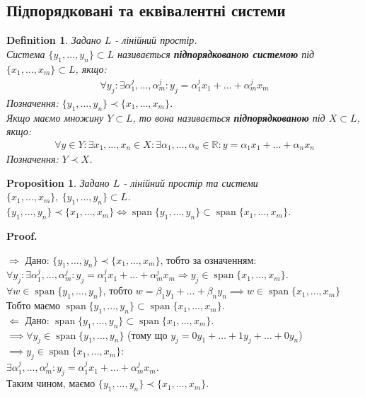 \documentclass[a4paper, 10pt]{article}
\makeatletter
\def\rightproof{$\boxed{\Rightarrow}$ }
\def\leftproof{$\boxed{\Leftarrow}$ }
\theoremstyle{theoremdd}
\newtheorem{definition}[theorem]{Definition}
\newtheorem{proposition}[theorem]{Proposition}
\DeclareMathOperator{\linspan}{span}
\renewenvironment{proof}[1][Proof.\\]{\par
\pushQED{\hfill \qed}%
\normalfont \topsep6\p@\@plus6\p@\relax
\trivlist
\item\relax
{\bfseries
#1\@addpunct{.}}\hspace\labelsep\ignorespaces
}{%
\popQED\endtrivlist\@endpefalse
}
\makeatother
\begin{document}
	\subsection{Підпорядковані та еквівалентні системи}
	\begin{definition}
	Задано $L$ - лінійний простір.\\
	Система $\{y_1, \dots, y_n \} \subset L$ називається \textbf{підпорядкованою системою} під $\{x_1, \dots, x_m\} \subset L$, якщо:
	\begin{align*}
	\forall y_j: \exists \alpha^j_1, \dots, \alpha^j_m: y_j = \alpha^j_1 x_1 + \dots + \alpha^j_m x_m
	\end{align*}
	Позначення: $\{y_1, \dots, y_n \} \prec \{x_1, \dots, x_m \}$.\\
	Якщо маємо множину $Y \subset L$, то вона називається \textbf{підпорядкованою} під $X \subset L$, якщо:
	\begin{align*}
	\forall y \in Y: \exists x_1,\dots,x_n \in X: \exists \alpha_1, \dots, \alpha_n \in \mathbb{R}: y = \alpha_1 x_1 + \dots + \alpha_n x_n
	\end{align*}
	Позначення: $Y \prec X$.
	\end{definition}
	
	\begin{proposition}
	\label{subordinate_prp1}
	Задано $L$ - лінійний простір та системи $\{x_1,\dots,x_m\},\ \{y_1,\dots,y_n\} \subset L$.\\
	$\{y_1, \dots, y_n \} \prec \{x_1, \dots, x_m \} \iff \linspan \{y_1, \dots, y_n\} \subset \linspan \{x_1, \dots, x_m \}$.
	\end{proposition}
	
	\begin{proof}
	\rightproof Дано: $\{y_1, \dots, y_n \} \prec \{x_1, \dots, x_m \}$, тобто за означенням:\\
	$\forall y_j: \exists \alpha^j_1, \dots, \alpha^j_m: y_j = \alpha^j_1 x_1 + \dots + \alpha^j_m x_m \Rightarrow y_j \in \linspan\{x_1, \dots, x_m\}$.\\
	$\forall w \in \linspan\{y_1, \dots, y_n\}$, тобто $w = \beta_1 y_1 + \dots + \beta_n y_n \implies w \in \linspan\{x_1, \dots, x_m\}$\\
	Тобто маємо $\linspan \{y_1, \dots, y_n\} \subset \linspan \{x_1, \dots, x_m \}$.
	\bigskip \\
	\leftproof Дано: $\linspan \{y_1, \dots, y_n\} \subset \linspan \{x_1, \dots, x_m \}$.\\
	$\implies \forall y_j \in \linspan \{y_1, \dots, y_n \}$ \hspace{0.2cm}(тому що $y_j = 0y_1 + \dots + 1 y_j + \dots + 0 y_n$)\hspace{0.2cm} $\implies y_j \in \linspan\{x_1,\dots,x_m\}$:\\
	$\exists \alpha^j_1, \dots, \alpha^j_m: y_j = \alpha^j_1 x_1 + \dots + \alpha^j_m x_m$.\\
	Таким чином, маємо $\{y_1, \dots, y_n \} \prec \{x_1, \dots, x_m \}$.
	\end{proof}
	
\end{document}
